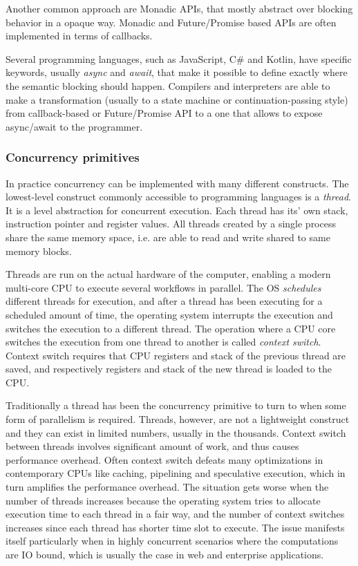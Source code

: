 Another common approach are Monadic APIs, that mostly abstract over blocking behavior in a opaque way. Monadic and Future/Promise based APIs are often implemented in terms of callbacks.

Several programming languages, such as JavaScript, C\# and Kotlin, have specific keywords, usually \textit{async} and \textit{await}, that make it possible to define exactly where the semantic blocking should happen. Compilers and interpreters are able to make a transformation (usually to a state machine or continuation-passing style) from callback-based or Future/Promise API to a one that allows to expose async/await to the programmer.


\subsubsection{Concurrency primitives}
In practice concurrency can be implemented with many different constructs. The lowest-level construct commonly accessible to programming languages is a \textit{thread}. It is a  level abstraction for concurrent execution. Each thread has its' own stack, instruction pointer and  register values. All threads created by a single process share the same memory space, i.e. are able to read and write shared to same memory blocks.

Threads are run on the actual hardware of the computer, enabling a modern multi-core CPU to execute several workflows in parallel. The OS \textit{schedules} different threads for execution, and after a thread has been executing for a scheduled amount of time, the operating system interrupts the execution and switches the execution to a different thread. The operation where a CPU core switches the execution from one thread to another is called \textit{context switch}. Context switch requires that CPU registers and stack of the previous thread are saved, and respectively registers and stack of the new thread is loaded to the CPU.

Traditionally a thread has been the concurrency primitive to turn to when some form of parallelism is required. Threads, however, are not a lightweight construct and they can exist in limited numbers, usually in the thousands. Context switch between threads involves significant amount of work, and thus causes performance overhead. Often context switch defeats many optimizations in contemporary CPUs like caching, pipelining and speculative execution, which in turn amplifies the performance overhead. The situation gets worse when the number of threads increases because the operating system tries to allocate execution time to each thread in a fair way, and the number of context switches increases since each thread has shorter time slot to execute. The issue manifests itself particularly when in highly concurrent scenarios where the computations are IO bound, which is usually the case in web and enterprise applications.

